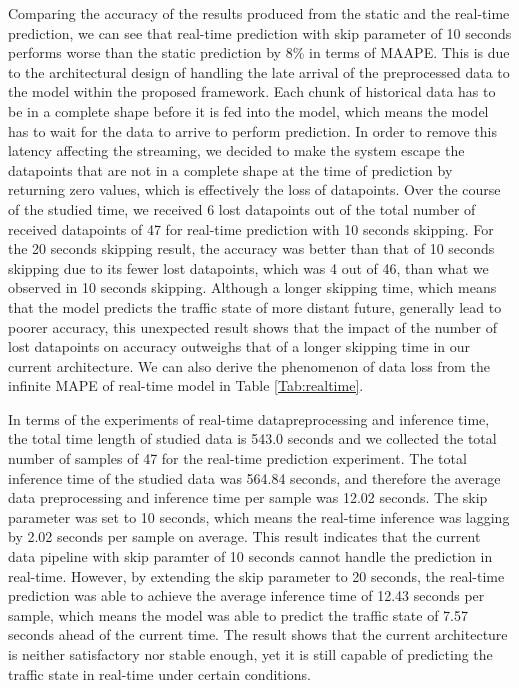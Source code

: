 \documentclass[11pt]{uonthesis}
\begin{document}
Comparing the accuracy of the results produced from the static and the real-time prediction, we can see that real-time prediction with skip parameter of 10 seconds performs worse than the static prediction by 8\% in terms of MAAPE. This is due to the architectural design of handling the late arrival of the preprocessed data to the model within the proposed framework. Each chunk of historical data has to be in a complete shape before it is fed into the model, which means the model has to wait for the data to arrive to perform prediction. In order to remove this latency affecting the streaming, we decided to make the system escape the datapoints that are not in a complete shape at the time of prediction by returning zero values, which is effectively the loss of datapoints. Over the course of the studied time, we received 6 lost datapoints out of the total number of received datapoints of 47 for real-time prediction with 10 seconds skipping. For the 20 seconds skipping result, the accuracy was better than that of 10 seconds skipping due to its fewer lost datapoints, which was 4 out of 46, than what we observed in 10 seconds skipping. Although a longer skipping time, which means that the model predicts the traffic state of more distant future, generally lead to poorer accuracy, this unexpected result shows that the impact of the number of lost datapoints on accuracy outweighs that of a longer skipping time in our current architecture. We can also derive the phenomenon of data loss from the infinite MAPE of real-time model in Table \ref{Tab:realtime}. %

In terms of the experiments of real-time datapreprocessing and inference time, the total time length of studied data is 543.0 seconds and we collected the total number of samples of 47 for the real-time prediction experiment. The total inference time of the studied data was 564.84 seconds, and therefore the average data preprocessing and inference time per sample was 12.02 seconds. The skip parameter was set to 10 seconds, which means the real-time inference was lagging by 2.02 seconds per sample on average. This result indicates that the current data pipeline with skip paramter of 10 seconds cannot handle the prediction in real-time. However, by extending the skip parameter to 20 seconds, the real-time prediction was able to achieve the average inference time of 12.43 seconds per sample, which means the model was able to predict the traffic state of 7.57 seconds ahead of the current time. The result shows that the current architecture is neither satisfactory nor stable enough, yet it is still capable of predicting the traffic state in real-time under certain conditions. %
\end{document}
